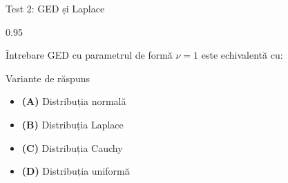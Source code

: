 \documentclass[9pt, aspectratio=169, t]{beamer}
\begin{document}
\begin{frame}{Test 2: GED și Laplace}
    \begin{cminipage}{0.95\textwidth}
    \begin{alertblock}{Întrebare}
        GED cu parametrul de formă $\nu = 1$ este echivalentă cu:
    \end{alertblock}
    \begin{block}{Variante de răspuns}
    \begin{itemize}\setlength{\itemsep}{0pt}
        \item \textcolor{MainBlue}{\textbf{(A)}} Distribuția normală
        \item \textcolor{MainBlue}{\textbf{(B)}} Distribuția Laplace
        \item \textcolor{MainBlue}{\textbf{(C)}} Distribuția Cauchy
        \item \textcolor{MainBlue}{\textbf{(D)}} Distribuția uniformă
    \end{itemize}
    \end{block}
    \end{cminipage}
\end{frame}
\end{document}
